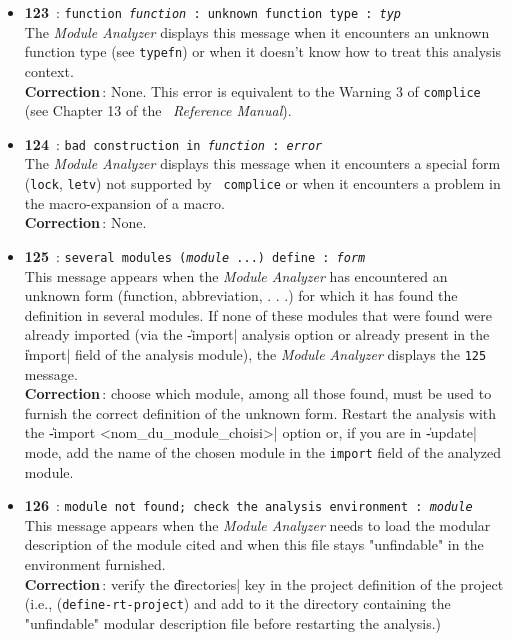 \begin{itemize}
\item {\Large {\bf 123}}\ : {\tt function {\em function}\,: unknown
function type\,: {\em typ}}\\ 
The {\em Module Analyzer} displays this message when it encounters an unknown function type (see {\tt typefn}) or when it doesn't know how to treat this analysis context.\\
{\bf Correction}\,: None. This error is equivalent to the Warning 3 of
{\tt complice} (see Chapter 13 of the \LeLisp\ {\em Reference Manual}).

\item {\Large {\bf 124}}\ : {\tt bad construction in {\em function} : {\em error}}\\
The {\em Module Analyzer} displays this message when it encounters a special form ({\tt lock}, {\tt letv}) not supported by {\tt
complice} or when it encounters a problem in the macro-expansion of a macro.\\ 
{\bf Correction}\,: None.

\item {\Large {\bf 125}}\ : {\tt several modules ({\em module} ...) define :
{\em form}}\\
This message appears when the {\em Module Analyzer} has encountered an unknown form (function, abbreviation, . . .) for which it has found the definition in several modules.  If none of these modules that were found were already imported (via the \|-import| analysis option or already present in the \|import| field of the analysis module), the {\em Module Analyzer} displays the {\tt 125} message.\\
{\bf Correction}\,: choose which module, among all those found, must be used to furnish the correct definition of the unknown form.  Restart the analysis with the \|-import
<nom_du_module_choisi>| option or, if you are in \|-update| mode, add the name of the chosen module in the {\tt import} field of the analyzed module.

\item {\Large {\bf 126}}\ : {\tt module not found; check the analysis
environment : {\em module}}\\
This message appears when the {\em Module Analyzer} needs to load the modular description of the module cited and when this file stays "unfindable" in the environment furnished.\\
{\bf Correction}\,: verify the \|directories| key in the project definition of the project (i.e., ({\tt define-rt-project}) and add to it the directory containing the "unfindable" modular description file before restarting the analysis.)


\end{itemize}
